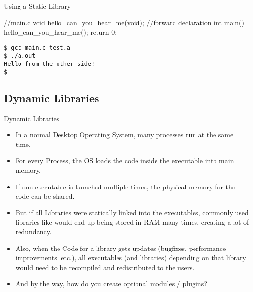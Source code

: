 \documentclass[10pt,graphics,aspectratio=169,table]{beamer}
\begin{document}
\begin{frame}[fragile]{Using a Static Library}
    \begin{codeblock}
//main.c
void hello_can_you_hear_me(void); //forward declaration
int main(){
    hello_can_you_hear_me();
    return 0;
}
    \end{codeblock}
    \begin{lstlisting}
$ gcc main.c test.a 
$ ./a.out
Hello from the other side!
$
    \end{lstlisting}
\end{frame}

\subsection{Dynamic Libraries}
\begin{frame}{Dynamic Libraries}
    \begin{itemize}
        \item In a normal Desktop Operating System,
            many processes run at the same time.
        \item For every Process, the OS loads the code inside the executable
            into main memory.
        \item If one executable is launched multiple times, the physical memory
            for the code can be shared.
        \item But if all Libraries were statically linked into the executables,
            commonly used libraries like  would end up being stored 
            in RAM many times, creating a lot of redundancy. 
    \end{itemize}
    \bigskip
    \begin{itemize}
        \item Also, when the Code for a library gets updates (bugfixes, 
            performance improvements, etc.), all executables (and libraries)
            depending on that library would need to be recompiled and redistributed
            to the users.
        \item And by the way, how do you create optional modules / plugins?
    \end{itemize}
\end{frame}
\end{document}
